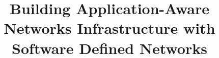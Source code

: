 \documentclass[onecolumn,draftclsnofoot]{hotsdn}
\begin{document}
%
\title{Building Application-Aware Networks Infrastructure with Software Defined Networks}



\author{ }



\maketitle


\begin{abstract}

\end{abstract}












\end{document}
